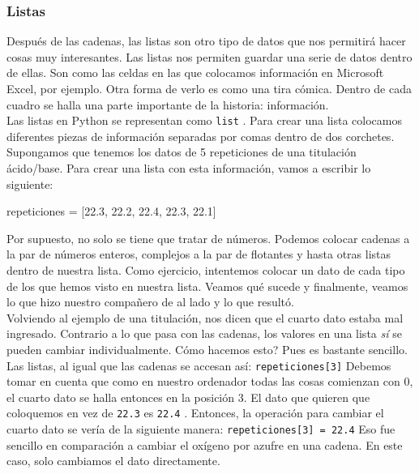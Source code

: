 \documentclass[10pt,letterpaper]{article}
\newcommand{\inlinecode}[1]{
\colorbox{light-gray}{\texttt{#1}}
}
\newenvironment{Code}
{
\begin{lrbox}{\selvestebox}%
\begin{minipage}{\dimexpr\columnwidth-2\fboxsep\relax}
\fontfamily{\ttdefault}\selectfont
}
{\end{minipage}\end{lrbox}%
\begin{center}
\colorbox{light-gray}{\usebox{\selvestebox}}
\end{center}
}
\begin{document}
\subsubsection{Listas}
Despu\'es de las cadenas, las listas son otro tipo de datos que nos permitir\'a hacer cosas muy interesantes. Las listas nos permiten guardar una serie de datos dentro de ellas. Son como las celdas en las que colocamos informaci\'on en Microsoft Excel, por ejemplo. Otra forma de verlo es como una tira c\'omica. Dentro de cada cuadro se halla una parte importante de la historia: informaci\'on.\\

Las listas en Python se representan como \inlinecode{list}. Para crear una lista colocamos diferentes piezas de informaci\'on separadas por comas dentro de dos corchetes. Supongamos que tenemos los datos de 5 repeticiones de una titulaci\'on \'acido/base. Para crear una lista con esta informaci\'on, vamos a escribir lo siguiente:

\begin{Code}
repeticiones = [22.3, 22.2, 22.4, 22.3, 22.1]
\end{Code}

Por supuesto, no solo se tiene que tratar de n\'umeros. Podemos colocar cadenas a la par de n\'umeros enteros, complejos a la par de flotantes y hasta otras listas dentro de nuestra lista. Como ejercicio, intentemos colocar un dato de cada tipo de los que hemos visto en nuestra lista. Veamos qu\'e sucede y finalmente, veamos lo que hizo nuestro compa\~nero de al lado y lo que result\'o.\\

Volviendo al ejemplo de una titulaci\'on, nos dicen que el cuarto dato estaba mal ingresado. Contrario a lo que pasa con las cadenas, los valores en una lista \emph{s\'i} se pueden cambiar individualmente. C\'omo hacemos esto? Pues es bastante sencillo. Las listas, al igual que las cadenas se accesan as\'i: \inlinecode{repeticiones[3]} Debemos tomar en cuenta que como en nuestro ordenador todas las cosas comienzan con 0, el cuarto dato se halla entonces en la posici\'on 3. El dato que quieren que coloquemos en vez de \inlinecode{22.3} es \inlinecode{22.4}. Entonces, la operaci\'on para cambiar el cuarto dato se ver\'ia de la siguiente manera: \inlinecode{repeticiones[3] = 22.4} Eso fue sencillo en comparaci\'on a cambiar el ox\'igeno por azufre en una cadena. En este caso, solo cambiamos el dato directamente.\\
\end{document}
